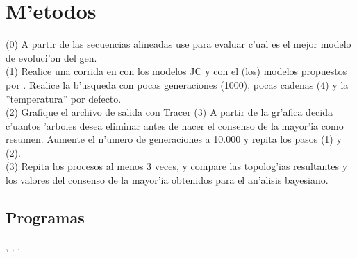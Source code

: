 \section{M'etodos}
\noindent
(0) A partir de las secuencias alineadas use  para evaluar c'ual es el mejor modelo de evoluci'on del gen.\\
(1) Realice una corrida en  con los modelos JC y con el (los) modelos propuestos por .
Realice la b'usqueda con pocas generaciones (1000), pocas cadenas (4) y la ''temperatura'' por defecto.\\
(2) Grafique el archivo de salida con Tracer 
(3) A partir de la gr'afica decida c'uantos 'arboles desea eliminar antes de hacer el consenso de la mayor'ia como resumen. Aumente el n'umero de generaciones a 10.000 y repita los pasos (1) y (2).\\
(3) Repita los procesos al menos 3 veces, y compare las topolog'ias resultantes y los valores del consenso de la mayor'ia obtenidos para el an'alisis bayesiano.
\subsection{Programas}
\noindent
{}, ,  .\\
